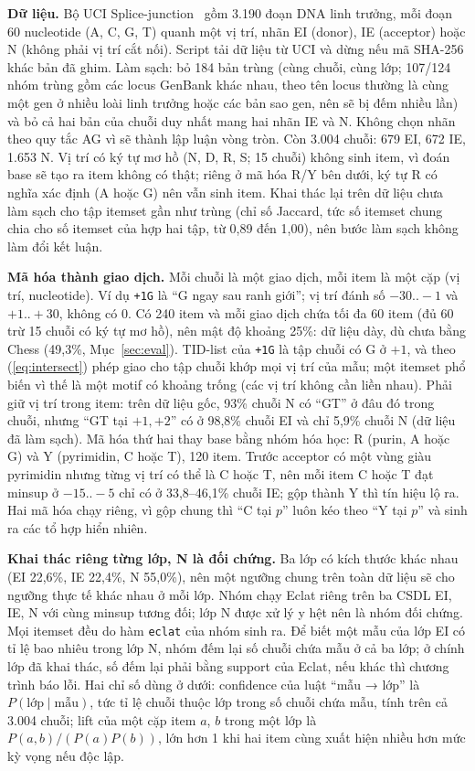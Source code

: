 \textbf{Dữ liệu.} Bộ UCI Splice-junction~\cite{uci1991splice,noordewier1990training} gồm 3.190 đoạn DNA linh
trưởng, mỗi đoạn 60 nucleotide (A, C, G, T) quanh một vị trí, nhãn EI (donor), IE (acceptor) hoặc N (không
phải vị trí cắt nối). Script tải dữ liệu từ UCI và dừng nếu mã SHA-256 khác bản đã ghim. Làm sạch: bỏ 184 bản
trùng (cùng chuỗi, cùng lớp; 107/124 nhóm trùng gồm các locus GenBank khác nhau, theo tên locus thường là
cùng một gen ở nhiều loài linh trưởng hoặc các bản sao gen, nên sẽ bị đếm nhiều lần) và bỏ
cả hai bản của chuỗi duy nhất mang hai nhãn IE và N. Không chọn nhãn theo quy tắc AG vì sẽ thành lập luận vòng
tròn. Còn 3.004 chuỗi: 679 EI, 672 IE, 1.653 N. Vị trí có ký tự mơ hồ (N, D, R, S; 15 chuỗi) không sinh item,
vì đoán base sẽ tạo ra item không có thật; riêng ở mã hóa R/Y bên dưới, ký tự R có nghĩa xác định (A hoặc G)
nên vẫn sinh item. Khai thác lại trên dữ liệu chưa làm sạch cho tập itemset gần như trùng (chỉ số Jaccard, tức
số itemset chung chia cho số itemset của hợp hai tập, từ 0,89 đến 1,00), nên bước làm sạch không làm đổi kết
luận.

\textbf{Mã hóa thành giao dịch.} Mỗi chuỗi là một giao dịch, mỗi item là một cặp (vị trí, nucleotide). Ví dụ
\texttt{+1G} là ``G ngay sau ranh giới''; vị trí đánh số $-30..-1$ và $+1..+30$, không có 0. Có 240 item và
mỗi giao dịch chứa tối đa 60 item (đủ 60 trừ 15 chuỗi có ký tự mơ hồ), nên mật độ khoảng 25\%: dữ liệu dày,
dù chưa bằng Chess (49,3\%, Mục~\ref{sec:eval}).
TID-list của \texttt{+1G} là tập chuỗi có G ở $+1$, và theo (\ref{eq:intersect}) phép giao cho tập chuỗi khớp
mọi vị trí của mẫu; một itemset phổ biến vì thế là một motif có khoảng trống (các vị trí không cần liền nhau).
Phải giữ vị trí trong item: trên dữ liệu gốc, 93\% chuỗi N có ``GT'' ở đâu đó trong chuỗi, nhưng ``GT tại $+1,+2$''
có ở 98,8\% chuỗi EI và chỉ 5,9\% chuỗi N (dữ liệu đã làm sạch). Mã hóa thứ hai thay base bằng nhóm hóa học:
R (purin, A hoặc G) và Y (pyrimidin, C hoặc T), 120 item. Trước acceptor có một vùng giàu pyrimidin nhưng từng
vị trí có thể là C hoặc T, nên mỗi item C hoặc T đạt minsup ở $-15..-5$ chỉ có ở 33,8--46,1\% chuỗi IE; gộp
thành Y thì tín hiệu lộ ra. Hai mã hóa chạy riêng, vì gộp chung thì ``C tại $p$'' luôn kéo theo ``Y tại $p$'' và
sinh ra các tổ hợp hiển nhiên.

\textbf{Khai thác riêng từng lớp, N là đối chứng.} Ba lớp có kích thước khác nhau (EI 22,6\%, IE 22,4\%, N
55,0\%), nên một ngưỡng chung trên toàn dữ liệu sẽ cho ngưỡng thực tế khác nhau ở mỗi lớp. Nhóm chạy Eclat
riêng trên ba CSDL EI, IE, N với cùng minsup tương đối; lớp N được xử lý y hệt nên là nhóm đối chứng. Mọi
itemset đều do hàm \texttt{eclat} của nhóm sinh ra. Để biết một mẫu của lớp EI có tỉ lệ bao nhiêu trong lớp N,
nhóm đếm lại số chuỗi chứa mẫu ở cả ba lớp; ở chính lớp đã khai thác, số đếm lại phải bằng support của Eclat,
nếu khác thì chương trình báo lỗi. Hai chỉ số dùng ở dưới: confidence của luật ``mẫu → lớp'' là
$P(\text{lớp} \mid \text{mẫu})$, tức tỉ lệ chuỗi thuộc lớp trong số chuỗi chứa mẫu, tính trên cả 3.004 chuỗi;
lift của một cặp item $a$, $b$ trong một lớp là $P(a,b)/(P(a)P(b))$, lớn hơn 1 khi hai item cùng xuất hiện
nhiều hơn mức kỳ vọng nếu độc lập.

